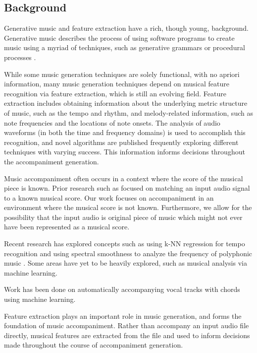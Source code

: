 \documentclass[11pt,conference,letterpaper]{IEEEtran}
\begin{document}
\subsection{Background}

Generative music and feature extraction have a rich, though young, background. Generative music describes the process of using software programs to create music using a myriad of techniques, such as generative grammars or procedural processes \cite{wooller2005framework}.

While some music generation techniques are solely functional, with no apriori information, many music generation techniques depend on musical feature recognition via feature extraction, which is still an evolving field. Feature extraction includes obtaining information about the underlying metric structure of music, such as the tempo and rhythm, and melody-related information, such as note frequencies and the locations of note onsets. The analysis of audio waveforms (in both the time and frequency domains) is used to accomplish this recognition, and novel algorithms are published frequently exploring different techniques with varying success. This information informs decisions throughout the accompaniment generation. 

Music accompaniment often occurs in a context where the score of the musical piece is known. Prior research such as \cite{dannenberg1984line} focused on matching an input audio signal to a known musical score. Our work focuses on accompaniment in an environment where the musical score is not known. Furthermore, we allow for the possibility that the input audio is original piece of music which might not ever have been represented as a musical score.

Recent research has explored concepts such as using k-NN regression for tempo recognition \cite{eronen2010music} and using spectral smoothness to analyze the frequency of polyphonic music \cite{klapuri2003multiple}. Some areas have yet to be heavily explored, such as musical analysis via machine learning.

Work has been done on automatically accompanying vocal tracks with chords \cite{simon2008mysong} using machine learning. \cite{morris2008exposing}

Feature extraction plays an important role in music generation, and forms the foundation of music accompaniment. Rather than accompany an input audio file directly, musical features are extracted from the file and used to inform decisions made throughout the course of accompaniment generation.
\end{document}
